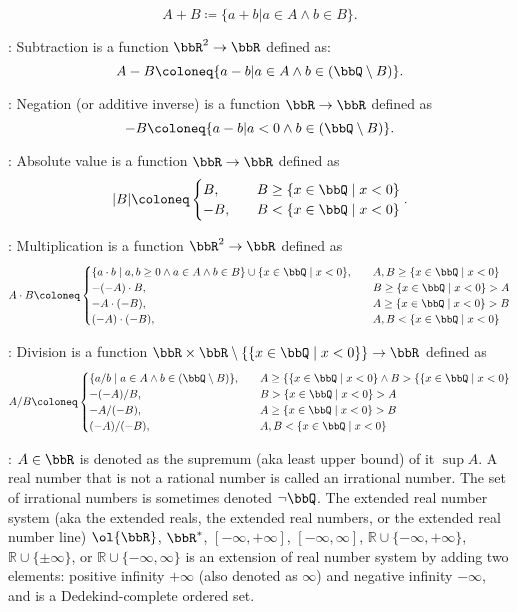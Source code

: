 \documentclass[a4paper,12pt]{report}
\begin{document}
\begin{itemizle}
\[A+B\coloneq\{a+b|a\in A\land b\in B\}.\]
\item {}: Subtraction is a function $\bbR^2\to\bbR$ defined as:
\[A-B\coloneq\{a-b|a\in A\land b\in(\bbQ\setminus B)\}.\]
\item {}: Negation (or additive inverse) is a function $\bbR\to\bbR$ defined as
\[-B\coloneq\{a-b|a<0\land b\in(\bbQ\setminus B)\}.\]
\item {}: Absolute value is a function $\bbR\to\bbR$ defined as
\[|B|\coloneq\begin{cases}
B,\quad&B\geq\{x\in\bbQ\mid x<0\}\\
-B,\quad&B<\{x\in\bbQ\mid x<0\}
\end{cases}.\]
\item {}: Multiplication is a function $\bbR^2\to\bbR$ defined as
\[A\cdot B\coloneq\begin{cases}
\{a\cdot b\mid a,b\geq 0\land a\in A\land b\in B\}\cup\{x\in\bbQ\mid x<0\},\quad&A,B\geq\{x\in\bbQ\mid x<0\}\\
-(-A)\cdot B,\quad&B\geq\{x\in\bbQ\mid x<0\}>A\\
-A\cdot (-B),\quad&A\geq\{x\in\bbQ\mid x<0\}>B\\
(-A)\cdot (-B),\quad&A,B<\{x\in\bbQ\mid x<0\}
\end{cases}\]
\item {}: Division is a function $\bbR\times\bbR\setminus\{\{x\in\bbQ\mid x<0\}\}\to\bbR$ defined as
\[A/B\coloneq\begin{cases}
\{a/b\mid a\in A\land b\in(\bbQ\setminus B)\},\quad&A\geq\{\{x\in\bbQ\mid x<0\}\land B>\{\{x\in\bbQ\mid x<0\}\\
-(-A)/B,\quad&B>\{x\in\bbQ\mid x<0\}>A\\
-A/(-B),\quad&A\geq\{x\in\bbQ\mid x<0\}>B\\
(-A)/(-B),\quad&A,B<\{x\in\bbQ\mid x<0\}
\end{cases}\]
\item {}: $A\in\bbR$ is denoted as the supremum (aka least upper bound) of it $\sup A$.
\eit
{}
A real number that is not a rational number is called an irrational number. The set of irrational numbers is sometimes denoted $\neg\bbQ$.
The extended real number system (aka the extended reals, the extended real numbers, or the extended real number line) $\ol{\bbR}$, $\bbR^*$, $[-\infty,+\infty]$, $[-\infty,\infty]$, $\mathbb{R}\cup\{-\infty,+\infty\}$, $\mathbb{R}\cup\{\pm\infty\}$, or $\mathbb{R}\cup\{-\infty,\infty\}$ is an extension of real number system by adding two elements: positive infinity $+\infty$ (also denoted as $\infty$) and negative infinity $-\infty$, and is a Dedekind-complete ordered set.

\end{itemizle}
\end{document}
